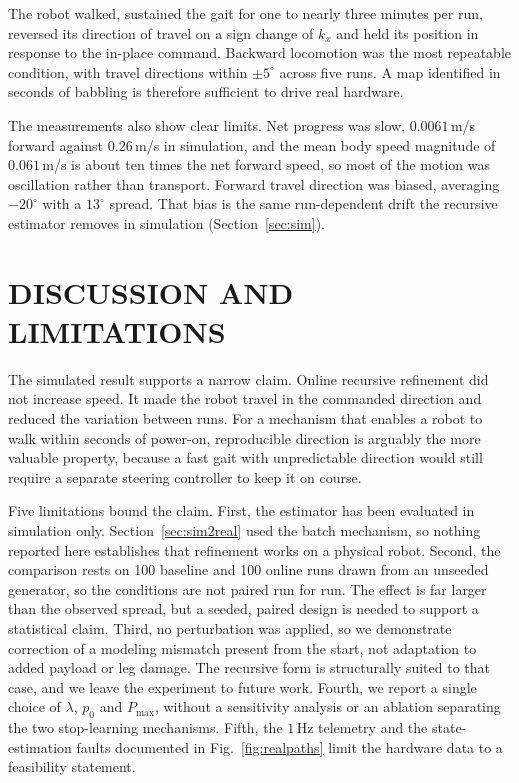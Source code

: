 \documentclass[a4paper, 10pt, conference]{ieeeconf}
\begin{document}
The robot walked, sustained the gait for one to nearly three minutes per
run, reversed its direction of travel on a sign change of $k_x$ and held its
position in response to the in-place command. Backward locomotion was the most
repeatable condition, with travel directions within $\pm5^\circ$ across five
runs. A map identified in seconds of babbling is therefore sufficient to drive
real hardware.



The measurements also show clear limits. Net progress was slow, $0.0061$\,m/s
forward against $0.26$\,m/s in simulation, and the mean body speed
magnitude of
$0.061$\,m/s is about ten times the net forward speed, so most of the motion was oscillation
rather than transport. Forward travel direction was biased, averaging $-20^\circ$
with a $13^\circ$ spread. That bias is the same run-dependent drift the
recursive estimator removes in simulation (Section~\ref{sec:sim}).


\section{DISCUSSION AND LIMITATIONS}

The simulated result supports a narrow claim. Online recursive
refinement did not increase speed. It made the robot travel in the commanded
direction and reduced the variation between runs. For a mechanism that enables a
robot to walk within seconds of power-on, reproducible direction is arguably the
more valuable property, because a fast gait with unpredictable direction would
still require a separate steering controller to keep it on course.



Five limitations bound the claim. First, the estimator has been
evaluated in simulation only. Section~\ref{sec:sim2real} used the batch mechanism,
so nothing reported here establishes that refinement works on a physical robot.
Second, the comparison rests on 100 baseline and 100 online runs drawn from an
unseeded generator, so the conditions are not paired run for run. The effect is
far larger than the observed spread, but a seeded, paired design is needed to
support a statistical claim. Third, no perturbation was applied, so we
demonstrate correction of a modeling mismatch present from the start, not
adaptation to added payload or leg damage. The recursive form is structurally
suited to that case, and we leave the experiment to future work. Fourth, we
report a single choice of $\lambda$, $p_0$ and $P_{\max}$, without a sensitivity
analysis or an ablation separating the two stop-learning mechanisms. Fifth, the
$1$\,Hz telemetry and the state-estimation faults documented in
Fig.~\ref{fig:realpaths} limit the hardware data to a feasibility statement.
\end{document}

